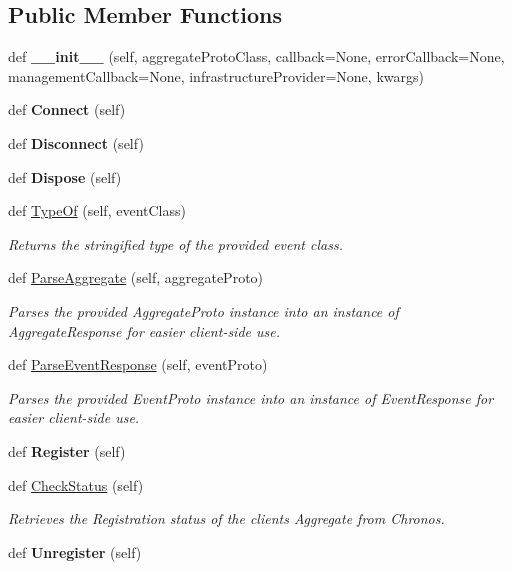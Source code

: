 \subsection*{Public Member Functions}
\begin{DoxyCompactItemize}
\item 
def {\bfseries \+\_\+\+\_\+init\+\_\+\+\_\+} (self, aggregate\+Proto\+Class, callback=None, error\+Callback=None, management\+Callback=None, infrastructure\+Provider=None, kwargs)
\item 
def {\bfseries Connect} (self)
\item 
def {\bfseries Disconnect} (self)
\item 
def {\bfseries Dispose} (self)
\item 
def \hyperlink{group__Chronos_gae5a664ef1c7bf294b17376794264699f}{Type\+Of} (self, event\+Class)
\begin{DoxyCompactList}\small\item\em Returns the stringified type of the provided event class. \end{DoxyCompactList}\item 
def \hyperlink{group__Chronos_ga73356a0cabbb65e5ee84927e98e66b18}{Parse\+Aggregate} (self, aggregate\+Proto)
\begin{DoxyCompactList}\small\item\em Parses the provided Aggregate\+Proto instance into an instance of Aggregate\+Response for easier client-\/side use. \end{DoxyCompactList}\item 
def \hyperlink{group__Chronos_gade70bdac06e41607144ef2a0fb7a3e36}{Parse\+Event\+Response} (self, event\+Proto)
\begin{DoxyCompactList}\small\item\em Parses the provided Event\+Proto instance into an instance of Event\+Response for easier client-\/side use. \end{DoxyCompactList}\item 
def {\bfseries Register} (self)
\item 
def \hyperlink{group__Chronos_ga6cae4fd381b0282b2aa5820b3d0f6266}{Check\+Status} (self)
\begin{DoxyCompactList}\small\item\em Retrieves the Registration status of the client\textquotesingle{}s Aggregate from Chronos. \end{DoxyCompactList}\item 
def {\bfseries Unregister} (self)
\item 

\end{DoxyCompactItemize}
